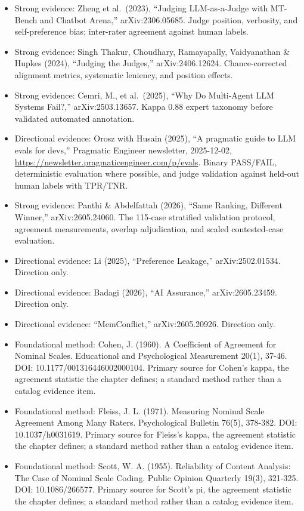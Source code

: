 \begin{itemize}
\tightlist
\item
  Strong evidence: Zheng et al.~(2023), ``Judging LLM-as-a-Judge with MT-Bench and Chatbot Arena,'' arXiv:2306.05685. Judge position, verbosity, and self-preference bias; inter-rater agreement against human labels.
\item
  Strong evidence: Singh Thakur, Choudhary, Ramayapally, Vaidyanathan \& Hupkes (2024), ``Judging the Judges,'' arXiv:2406.12624. Chance-corrected alignment metrics, systematic leniency, and position effects.
\item
  Strong evidence: Cemri, M., et al.~(2025), ``Why Do Multi-Agent LLM Systems Fail?,'' arXiv:2503.13657. Kappa 0.88 expert taxonomy before validated automated annotation.
\item
  Directional evidence: Orosz with Husain (2025), ``A pragmatic guide to LLM evals for devs,'' Pragmatic Engineer newsletter, 2025-12-02, \url{https://newsletter.pragmaticengineer.com/p/evals}. Binary PASS/FAIL, deterministic evaluation where possible, and judge validation against held-out human labels with TPR/TNR.
\item
  Strong evidence: Panthi \& Abdelfattah (2026), ``Same Ranking, Different Winner,'' arXiv:2605.24060. The 115-case stratified validation protocol, agreement measurements, overlap adjudication, and scaled contested-case evaluation.
\item
  Directional evidence: Li (2025), ``Preference Leakage,'' arXiv:2502.01534. Direction only.
\item
  Directional evidence: Badagi (2026), ``AI Assurance,'' arXiv:2605.23459. Direction only.
\item
  Directional evidence: ``MemConflict,'' arXiv:2605.20926. Direction only.
\item
  Foundational method: Cohen, J. (1960). A Coefficient of Agreement for Nominal Scales. Educational and Psychological Measurement 20(1), 37-46. DOI: 10.1177/001316446002000104. Primary source for Cohen's kappa, the agreement statistic the chapter defines; a standard method rather than a catalog evidence item.
\item
  Foundational method: Fleiss, J. L. (1971). Measuring Nominal Scale Agreement Among Many Raters. Psychological Bulletin 76(5), 378-382. DOI: 10.1037/h0031619. Primary source for Fleiss's kappa, the agreement statistic the chapter defines; a standard method rather than a catalog evidence item.
\item
  Foundational method: Scott, W. A. (1955). Reliability of Content Analysis: The Case of Nominal Scale Coding. Public Opinion Quarterly 19(3), 321-325. DOI: 10.1086/266577. Primary source for Scott's pi, the agreement statistic the chapter defines; a standard method rather than a catalog evidence item.
\end{itemize}

